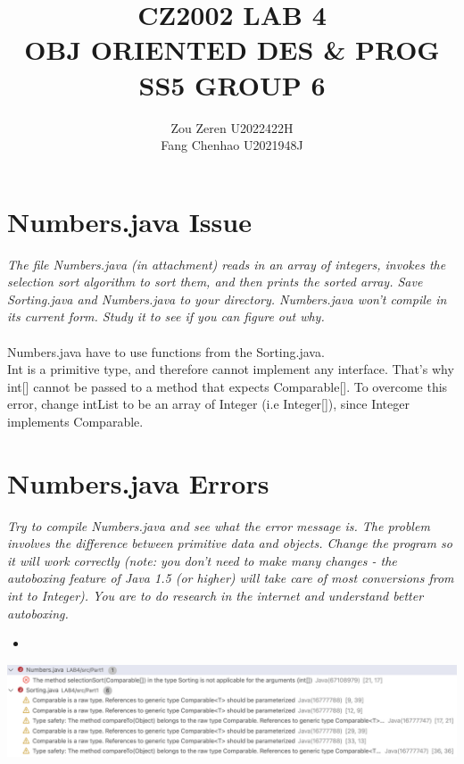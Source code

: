 \documentclass[hidelinks,12pt]{article}
\begin{document}
\title{CZ2002 LAB 4\\
\large OBJ ORIENTED DES \& PROG\\ SS5 GROUP 6}
\date{}
\author{Zou Zeren U2022422H\\
Fang Chenhao U2021948J}
\maketitle\thispagestyle{fancy}
\tableofcontents
\newpage

\section{Numbers.java Issue}
\textit{The file Numbers.java (in attachment) reads in an array of integers, invokes the selection sort
algorithm to sort them, and then prints the sorted array. Save Sorting.java and Numbers.java to your
directory. Numbers.java won't compile in its current form. Study it to see if you can figure out why.}
\\ \\ 
Numbers.java have to use functions from the Sorting.java.\\
Int is a primitive type, and therefore cannot implement any interface. That's why int[] cannot be passed to a method that expects Comparable[].
To overcome this error, change intList to be an array of Integer (i.e Integer[]), since Integer implements Comparable.
\section{Numbers.java Errors}
\textit{Try to compile Numbers.java and see what the error message is. The problem involves the difference
between primitive data and objects. Change the program so it will work correctly (note: you don't need
to make many changes - the autoboxing feature of Java 1.5 (or higher) will take care of most
conversions from int to Integer). You are to do research in the internet and understand better
autoboxing. }
\begin{itemize}
    \item[] 
\end{itemize}
\qquad\includegraphics[scale=0.4]{numbers_error.png} 
\end{document}
